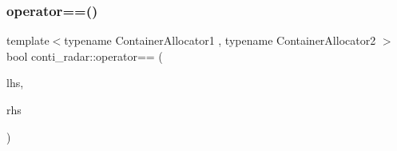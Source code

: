 \mbox{\label{namespaceconti__radar_a02b979557924ab172d8ffb8c385a04e4}} 
\subsubsection{\texorpdfstring{operator==()}{operator==()}\hspace{0.1cm}{\footnotesize\ttfamily [2/2]}}
{\footnotesize\ttfamily template$<$typename Container\+Allocator1 , typename Container\+Allocator2 $>$ \\
bool conti\+\_\+radar\+::operator== (\begin{DoxyParamCaption}\item[{const \+::\hyperlink{structconti__radar_1_1ContiRadar__}{conti\+\_\+radar\+::\+Conti\+Radar\+\_\+}$<$ Container\+Allocator1 $>$ \&}]{lhs,  }\item[{const \+::\hyperlink{structconti__radar_1_1ContiRadar__}{conti\+\_\+radar\+::\+Conti\+Radar\+\_\+}$<$ Container\+Allocator2 $>$ \&}]{rhs }\end{DoxyParamCaption})}

